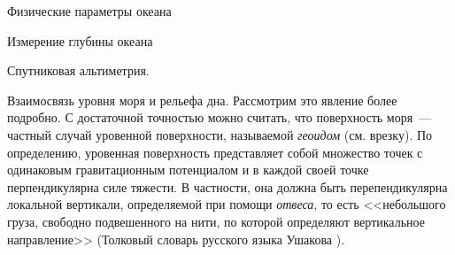 \begin{chapter}{Физические параметры океана}
\begin{section}{Измерение глубины океана}
\begin{paragraph}{Спутниковая альтиметрия.}
\begin{subparagraph}{Взаимосвязь уровня моря и рельефа дна.}
Рассмотрим это явление более подробно. С достаточной точностью можно считать, 
что поверхность моря~--- частный случай уровенной поверхности, называемой
\emph{геоидом} (см. врезку). По определению, уровенная поверхность 
представляет собой множество точек с одинаковым гравитационным потенциалом
и в каждой своей точке перпендикулярна силе тяжести. 
В частности, она должна быть перепендикулярна локальной вертикали, определяемой
при помощи \emph{отвеса}, то есть <<небольшого груза, свободно подвешенного 
на нити, по которой определяют вертикальное направление>> (Толковый словарь 
русского языка Ушакова%
).
%


\end{subparagraph}
\end{paragraph}
\end{section}
\end{chapter}
